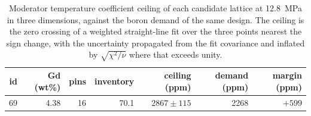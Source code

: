\begin{table}[htbp]
  \centering
  \caption[Boron ceiling of each candidate lattice]{Moderator temperature coefficient ceiling of each candidate lattice at \SI{12.8}{MPa} in three dimensions, against the boron demand of the same design. The ceiling is the zero crossing of a weighted straight-line fit over the three points nearest the sign change, with the uncertainty propagated from the fit covariance and inflated by $\sqrt{\chi^2/\nu}$ where that exceeds unity.}
  \label{tab:c9-ceilings}
  \begin{tabular}{rrrrrrr}
    \toprule
    id & Gd (wt\%) & pins & inventory & ceiling (ppm) & demand (ppm) & margin (ppm) \\
    \midrule
    69 & 4.38 & 16 & 70.1 & $2867 \pm 115$ & 2268 & $+599$ \\
    \bottomrule
  \end{tabular}
\end{table}

